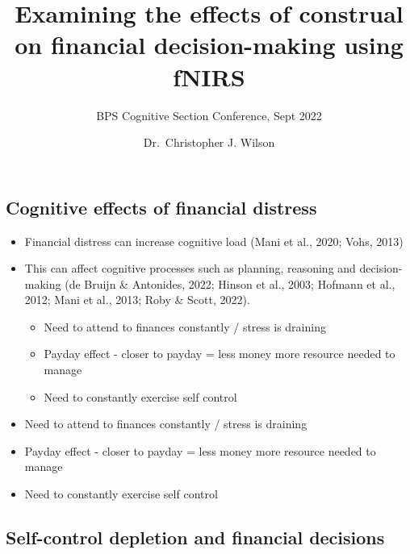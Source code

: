 \documentclass[
  letterpaper,
  DIV=11,
  numbers=noendperiod]{scrartcl}
\title{Examining the effects of construal on financial decision-making
using fNIRS}
\subtitle{BPS Cognitive Section Conference, Sept 2022}
\author{Dr.~Christopher J. Wilson}
\date{}
\providecommand{\tightlist}{%
  \setlength{\itemsep}{0pt}\setlength{\parskip}{0pt}}\usepackage{longtable,booktabs,array}
\begin{document}
\maketitle
\ifdefined\Shaded\renewenvironment{Shaded}{\begin{tcolorbox}[interior hidden, breakable, sharp corners, borderline west={3pt}{0pt}{shadecolor}, enhanced, boxrule=0pt, frame hidden]}{\end{tcolorbox}}\fi

\hypertarget{cognitive-effects-of-financial-distress}{%
\subsection{Cognitive effects of financial
distress}\label{cognitive-effects-of-financial-distress}}

\begin{itemize}
\item
  Financial distress can increase cognitive load (Mani et al., 2020;
  Vohs, 2013)
\item
  This can affect cognitive processes such as planning, reasoning and
  decision-making (de Bruijn \& Antonides, 2022; Hinson et al., 2003;
  Hofmann et al., 2012; Mani et al., 2013; Roby \& Scott, 2022).

  \begin{itemize}
  \tightlist
  \item
    Need to attend to finances constantly / stress is draining
  \item
    Payday effect - closer to payday = less money more resource needed
    to manage
  \item
    Need to constantly exercise self control
  \end{itemize}
\end{itemize}

\begin{itemize}
\tightlist
\item
  Need to attend to finances constantly / stress is draining
\item
  Payday effect - closer to payday = less money more resource needed to
  manage
\item
  Need to constantly exercise self control
\end{itemize}

\hypertarget{self-control-depletion-and-financial-decisions}{%
\subsection{Self-control depletion and financial
decisions}\label{self-control-depletion-and-financial-decisions}}
\end{document}

